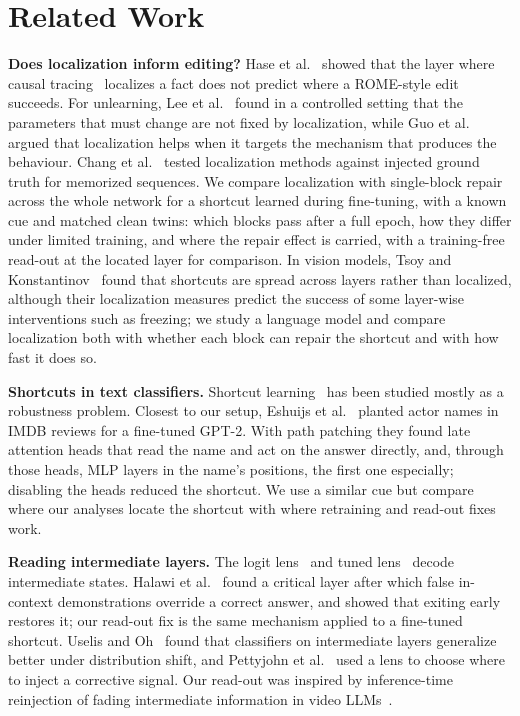 \section{Related Work}
\label{sec:related}

\textbf{Does localization inform editing?} Hase et al.~\cite{hase2023localization} showed that the layer where causal
tracing~\cite{meng2022locating} localizes a fact does not predict where a ROME-style edit succeeds. For unlearning,
Lee et al.~\cite{lee2025unlearning} found in a controlled setting that the parameters that must change are not fixed by
localization, while Guo et al.~\cite{guo2025mechanistic} argued that localization helps when it targets the mechanism
that produces the behaviour. Chang et al.~\cite{chang2024localization} tested localization methods against injected
ground truth for memorized sequences. We compare localization with single-block repair across the whole network for a
shortcut learned during fine-tuning, with a known cue and matched clean twins: which blocks pass after a full epoch,
how they differ under limited training, and where the repair effect is carried, with a training-free read-out at the
located layer for comparison. In vision models, Tsoy and Konstantinov~\cite{tsoy2025shortcutloc} found that shortcuts
are spread across layers rather than localized, although their localization measures predict the success of some
layer-wise interventions such as freezing; we study a language model and compare localization both with whether each
block can repair the shortcut and with how fast it does so.

\textbf{Shortcuts in text classifiers.} Shortcut learning~\cite{geirhos2020shortcut} has been studied mostly as a
robustness problem. Closest to our setup, Eshuijs et al.~\cite{eshuijs2025short} planted actor names in IMDB reviews
for a fine-tuned GPT-2. With path patching they found late attention heads that read the name and act on the answer
directly, and, through those heads, MLP layers in the name's positions, the first one especially; disabling the heads
reduced the shortcut. We use a similar cue but compare where our analyses locate the shortcut with where retraining
and read-out fixes work.

\textbf{Reading intermediate layers.} The logit lens~\cite{nostalgebraist2020logitlens} and tuned
lens~\cite{belrose2023tunedlens} decode intermediate states. Halawi et al.~\cite{halawi2024overthinking} found a
critical layer after which false in-context demonstrations override a correct answer, and showed that exiting early
restores it; our read-out fix is the same mechanism applied to a fine-tuned shortcut. Uselis and
Oh~\cite{uselis2025ilc} found that classifiers on intermediate layers generalize better under distribution shift, and
Pettyjohn et al.~\cite{pettyjohn2026hidden} used a lens to choose where to inject a corrective signal. Our read-out was
inspired by inference-time reinjection of fading intermediate information in video LLMs~\cite{shin2026fades}.

